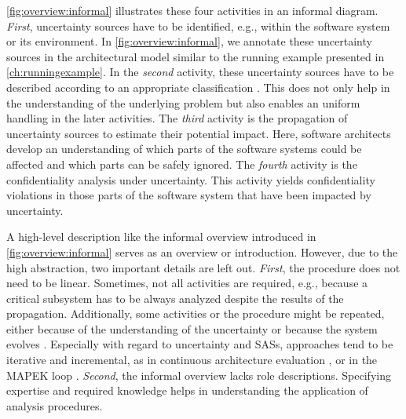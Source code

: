 \autoref{fig:overview:informal} illustrates these four activities in an informal diagram.
\emph{First}, uncertainty sources have to be identified, e.g., within the software system or its environment.
In \autoref{fig:overview:informal}, we annotate these uncertainty sources in the architectural model similar to the running example presented in \autoref{ch:runningexample}.
In the \emph{second} activity, these uncertainty sources have to be described according to an appropriate classification \cite{hahner_classification_2023}.
This does not only help in the understanding of the underlying problem but also enables an uniform handling in the later activities.
The \emph{third} activity is the propagation of uncertainty sources to estimate their potential impact.
Here, software architects develop an understanding of which parts of the software systems could be affected and which parts can be safely ignored.
The \emph{fourth} activity is the confidentiality analysis under uncertainty.
This activity yields confidentiality violations in those parts of the software system that have been impacted by uncertainty.


A high-level description like the informal overview introduced in \autoref{fig:overview:informal} serves as an overview or introduction.
However, due to the high abstraction, two important details are left out.
\emph{First}, the procedure does not need to be linear.
Sometimes, not all activities are required, e.g., because a critical subsystem has to be always analyzed despite the results of the propagation.
Additionally, some activities or the procedure might be repeated, either because of the understanding of the uncertainty or because the system evolves \cite{weyns_towards_2023}.
Especially with regard to uncertainty and \acp{SAS}, approaches tend to be iterative and incremental, as in continuous architecture evaluation \cite{sobhy_evaluation_2021}, or in the \acf{MAPEK} loop \cite{kephart_vision_2003,weyns_patterns_2013}.
\emph{Second}, the informal overview lacks role descriptions.
Specifying expertise and required knowledge helps in understanding the application of analysis procedures.

